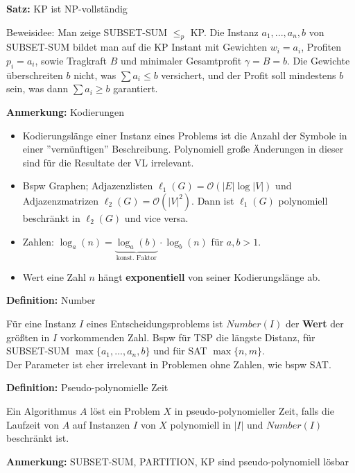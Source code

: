 \documentclass[a4paper,graphics,11pt]{article}
\begin{document}
\strut

\textbf{Satz:} KP ist \textsf{NP}-vollständig

Beweisidee: Man zeige SUBSET-SUM $\leq_p$ KP. Die Instanz $a_1,...,a_n,b$ von SUBSET-SUM
bildet man auf die KP Instant mit Gewichten $w_i = a_i$, Profiten $p_i = a_i$, sowie Tragkraft
$B$ und minimaler Gesamtprofit $\gamma = B = b$. Die Gewichte überschreiten $b$ nicht,
was $\sum a_i \leq b$ versichert, und der Profit soll mindestens $b$ sein, was dann
$\sum a_i \geq b$ garantiert.

\strut

\textbf{Anmerkung:} Kodierungen
\begin{itemize}
    \item Kodierungslänge einer Instanz eines Problems ist die Anzahl der Symbole in
        einer ''vernünftigen'' Beschreibung. Polynomiell große Änderungen
        in dieser sind für die Resultate der VL irrelevant.
    \item Bspw Graphen; Adjazenzlisten $\ell_1(G) = \mathcal{O}(|E| \log |V|)$ und
        Adjazenzmatrizen $\ell_2(G) = \mathcal{O}(|V|^2)$. Dann ist $\ell_1(G)$ polynomiell
        beschränkt in $\ell_2(G)$ und vice versa.
    \item Zahlen: $\log_a(n) = \underbrace{\log_a(b)}_{\text{konst. Faktor}} \cdot \log_b(n)$ für $a,b > 1$.
    \item Wert eine Zahl $n$ hängt \textbf{exponentiell} von seiner Kodierungslänge ab.
\end{itemize}

\strut

\textbf{Definition:} Number

Für eine Instanz $I$ eines Entscheidungsproblems ist $Number(I)$ der \textbf{Wert} der größten
in $I$ vorkommenden Zahl. Bspw für TSP die längste Distanz, für SUBSET-SUM $\max\{a_1,...,a_n,b\}$
und für SAT $\max\{n,m\}$.\\
Der Parameter ist eher irrelevant in Problemen ohne Zahlen, wie bspw SAT.

\strut

\textbf{Definition:} Pseudo-polynomielle Zeit

Ein Algorithmus $A$ löst ein Problem $X$ in pseudo-polynomieller Zeit, falls die Laufzeit von
$A$ auf Instanzen $I$ von $X$ polynomiell in $|I|$ und $Number(I)$ beschränkt ist.

\strut

\textbf{Anmerkung:} SUBSET-SUM, PARTITION, KP sind pseudo-polynomiell lösbar
\end{document}
